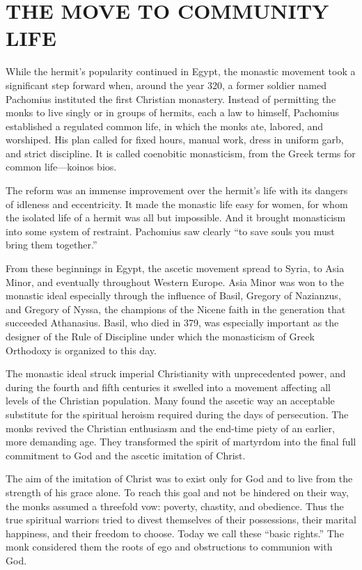 \section{THE MOVE TO COMMUNITY LIFE}

While the hermit’s popularity continued in Egypt, the monastic movement took a significant step
forward when, around the year 320, a former soldier named Pachomius instituted the first Christian
monastery. Instead of permitting the monks to live singly or in groups of hermits, each a law to
himself, Pachomius established a regulated common life, in which the monks ate, labored, and
worshiped. His plan called for fixed hours, manual work, dress in uniform garb, and strict
discipline. It is called coenobitic monasticism, from the Greek terms for common life—koinos bios.

The reform was an immense improvement over the hermit’s life with its dangers of idleness and
eccentricity. It made the monastic life easy for women, for whom the isolated life of a hermit was
all but impossible. And it brought monasticism into some system of restraint. Pachomius saw clearly
“to save souls you must bring them together.”

From these beginnings in Egypt, the ascetic movement spread to Syria, to Asia Minor, and eventually
throughout Western Europe. Asia Minor was won to the monastic ideal especially through the influence
of Basil, Gregory of Nazianzus, and Gregory of Nyssa, the champions of the Nicene faith in the
generation that succeeded Athanasius. Basil, who died in 379, was especially important as the
designer of the Rule of Discipline under which the monasticism of Greek Orthodoxy is organized to
this day.

The monastic ideal struck imperial Christianity with unprecedented power, and during the fourth and
fifth centuries it swelled into a movement affecting all levels of the Christian population. Many
found the ascetic way an acceptable substitute for the spiritual heroism required during the days of
persecution. The monks revived the Christian enthusiasm and the end-time piety of an earlier, more
demanding age. They transformed the spirit of martyrdom into the final full commitment to God and
the ascetic imitation of Christ.

The aim of the imitation of Christ was to exist only for God and to live from the strength of his
grace alone. To reach this goal and not be hindered on their way, the monks assumed a threefold vow:
poverty, chastity, and obedience. Thus the true spiritual warriors tried to divest themselves of
their possessions, their marital happiness, and their freedom to choose. Today we call these “basic
rights.” The monk considered them the roots of ego and obstructions to communion with God.

